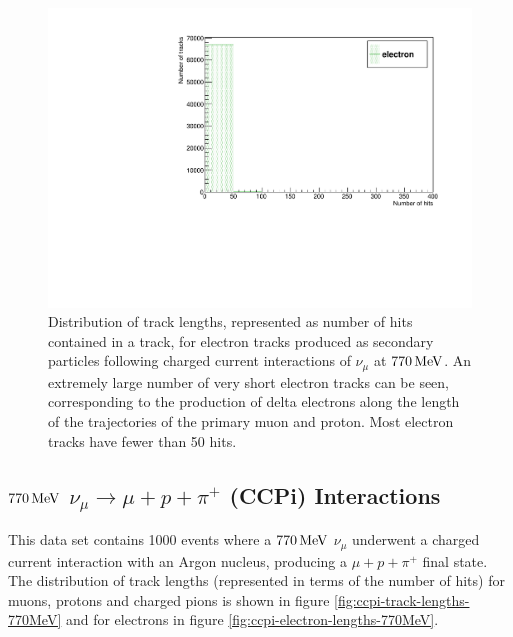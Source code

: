 \begin{figure}
\centering
\includegraphics[angle=-90,width=\textwidth]{chapters/particleid_images/electron-lengths-ccqe-770}
\caption[Track length distribution for $e^{-}$ from $770\MeV$ neutrinos (CCQE)]{\label{fig:ccqe-electron-lengths-770MeV}Distribution of track lengths, represented as number of hits contained in a track, for electron tracks produced as secondary particles following charged current interactions of $\nu_\mu$ at $770\MeV$. An extremely large number of very short electron tracks can be seen, corresponding to the production of delta electrons along the length of the trajectories of the primary muon and proton. Most electron tracks have fewer than 50 hits.}
\end{figure}

\subsection{$770\MeV$ $\nu_\mu \rightarrow \mu + p + \pi^+$ (CCPi) Interactions}
This data set contains 1000 events where a $770\MeV$ $\nu_\mu$ underwent a charged current interaction with an Argon nucleus, producing a $\mu + p + \pi^+$ final state. The distribution of track lengths (represented in terms of the number of hits) for muons, protons and charged pions is shown in figure \ref{fig:ccpi-track-lengths-770MeV} and for electrons in figure \ref{fig:ccpi-electron-lengths-770MeV}.

